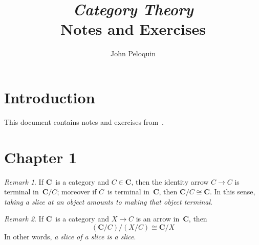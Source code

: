 \documentclass[letterpaper,12pt]{article}
\title{\textit{Category Theory}\\Notes and Exercises}
\author{John Peloquin}
\date{}
\newcommand{\iso}{\cong}
\newcommand{\cat}[1]{\mathbf{#1}}
\newcommand{\C}{\cat{C}}
\theoremstyle{definition}
\theoremstyle{remark}
\newtheorem*{rmk}{Remark}
\theoremstyle{direction}
\begin{document}
\maketitle

\section*{Introduction}
This document contains notes and exercises from~\cite{awodey}.

\section*{Chapter 1}
\begin{rmk}
If \(\C\)~is a category and \(C\in\C\), then the identity arrow \(C\to C\) is terminal in~\(\C/C\); moreover if \(C\)~is terminal in~\(\C\), then \(\C/C\iso\C\). In this sense, \emph{taking a slice at an object amounts to making that object terminal}.
\end{rmk}

\begin{rmk}
If \(\C\)~is a category and \(X\to C\) is an arrow in~\(\C\), then
\[(\C/C)/(X/C)\iso\C/X\]
In other words, \emph{a slice of a slice is a slice}.
\end{rmk}
\end{document}

